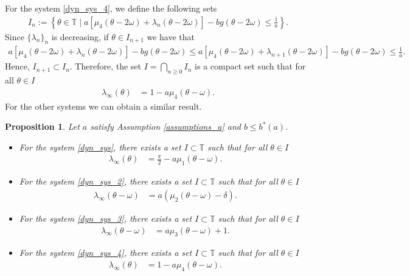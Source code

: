 \documentclass[12pt]{article}
\newcommand{\T}{\mathbb{T}}
\theoremstyle{plain}
\newtheorem{prop}[defn]{Proposition}
\theoremstyle{remark}
\theoremstyle{definition}
\begin{document}
For the system \eqref{dyn_sys_4}, we define the following sets
\begin{align*}
    I_n:=\left\{\theta\in\T\mid a[\mu_4(\theta-2\omega)+\lambda_n(\theta-2\omega)] - b g(\theta-2\omega)\leq\frac{1}{a}\right\}.
\end{align*}
Since $\{\lambda_n\}_n$ is decreasing, if $\theta\in I_{n+1}$ we have that
\begin{align*}
    a[\mu_4(\theta-2\omega)+\lambda_n(\theta-2\omega)] - b g(\theta-2\omega) \leq a[\mu_4(\theta-2\omega)+\lambda_{n+1}(\theta-2\omega)] - b g(\theta-2\omega) \leq\frac{1}{a}.
\end{align*}
Hence, $I_{n+1}\subset I_{n}$. Therefore, the set $I=\bigcap_{n\geq0}I_n$ is a compact set such that for all $\theta\in I$
\begin{align*}
    \lambda_\infty(\theta) &= 1 - a\mu_4(\theta-\omega).
\end{align*}
For the other systems we can obtain a similar result.
\begin{prop}
    Let $a$ satisfy Assumption \eqref{assumptions_a} and $b\leq b^*(a)$.
    \begin{itemize}
        \item For the system \eqref{dyn_sys}, there exists a set $I\subset\T$ such that for all $\theta\in I$
        \begin{align*}
            \lambda_\infty(\theta) &= \frac{\pi}{2} - a\mu_1(\theta-\omega).
        \end{align*}
        \item For the system \eqref{dyn_sys_2}, there exists a set $I\subset\T$ such that for all $\theta\in I$
        \begin{align*}
            \lambda_\infty(\theta-\omega)&=a(\mu_2(\theta-\omega)-\delta).
        \end{align*}
        \item For the system \eqref{dyn_sys_3}, there exists a set $I\subset\T$ such that for all $\theta\in I$
        \begin{align*}
             \lambda_\infty(\theta-\omega)&=a\mu_3(\theta-\omega)+1.
        \end{align*}
        \item For the system \eqref{dyn_sys_4}, there exists a set $I\subset\T$ such that for all $\theta\in I$
        \begin{align*}
            \lambda_\infty(\theta) &= 1 - a\mu_4(\theta-\omega).
        \end{align*}
    \end{itemize}
\end{prop}
\end{document}
